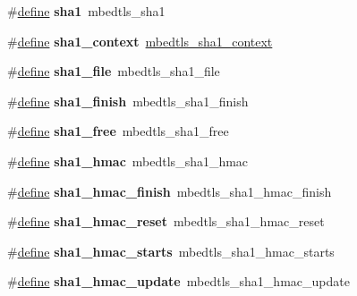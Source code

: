 \begin{DoxyCompactItemize}
\#\hyperlink{structdefine}{define} {\bfseries sha1}~mbedtls\+\_\+sha1
\item 
\mbox{\label{compat-1_83_8h_a77f593d0842e0464ffd4e4334587c182}} 
\#\hyperlink{structdefine}{define} {\bfseries sha1\+\_\+context}~\hyperlink{structmbedtls__sha1__context}{mbedtls\+\_\+sha1\+\_\+context}
\item 
\mbox{\label{compat-1_83_8h_ad137235c01d8e1fd68948c65d4e34215}} 
\#\hyperlink{structdefine}{define} {\bfseries sha1\+\_\+file}~mbedtls\+\_\+sha1\+\_\+file
\item 
\mbox{\label{compat-1_83_8h_aca5cbc8e6f9497097809b57f5275dad8}} 
\#\hyperlink{structdefine}{define} {\bfseries sha1\+\_\+finish}~mbedtls\+\_\+sha1\+\_\+finish
\item 
\mbox{\label{compat-1_83_8h_a61141cb2187642451fe00ade46858def}} 
\#\hyperlink{structdefine}{define} {\bfseries sha1\+\_\+free}~mbedtls\+\_\+sha1\+\_\+free
\item 
\mbox{\label{compat-1_83_8h_ada0735a6e515883cf97fa8be5491c299}} 
\#\hyperlink{structdefine}{define} {\bfseries sha1\+\_\+hmac}~mbedtls\+\_\+sha1\+\_\+hmac
\item 
\mbox{\label{compat-1_83_8h_a91a2e10f00f5ba06e1bccadefe89224a}} 
\#\hyperlink{structdefine}{define} {\bfseries sha1\+\_\+hmac\+\_\+finish}~mbedtls\+\_\+sha1\+\_\+hmac\+\_\+finish
\item 
\mbox{\label{compat-1_83_8h_a2a169d68e85b1b00d80135129c750b59}} 
\#\hyperlink{structdefine}{define} {\bfseries sha1\+\_\+hmac\+\_\+reset}~mbedtls\+\_\+sha1\+\_\+hmac\+\_\+reset
\item 
\mbox{\label{compat-1_83_8h_aba4a4712fca3c10e8e96ab5aa081f34b}} 
\#\hyperlink{structdefine}{define} {\bfseries sha1\+\_\+hmac\+\_\+starts}~mbedtls\+\_\+sha1\+\_\+hmac\+\_\+starts
\item 
\mbox{\label{compat-1_83_8h_a0eacc03c5583dbf23e32ba0a67284444}} 
\#\hyperlink{structdefine}{define} {\bfseries sha1\+\_\+hmac\+\_\+update}~mbedtls\+\_\+sha1\+\_\+hmac\+\_\+update
\item 

\end{DoxyCompactItemize}
